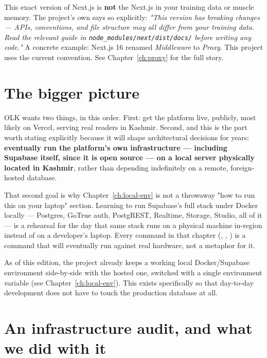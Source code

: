 \begin{olkwarn}
This exact version of Next.js is \textbf{not} the Next.js in your training data or muscle memory. The project's own  says so explicitly: \emph{"This version has breaking changes — APIs, conventions, and file structure may all differ from your training data. Read the relevant guide in \texttt{node\_modules/next/dist/docs/} before writing any code."} A concrete example: Next.js 16 renamed \emph{Middleware} to \emph{Proxy}. This project uses the current  convention. See Chapter~\ref{ch:proxy} for the full story.
\end{olkwarn}

\section{The bigger picture}

OLK wants two things, in this order. First: get the platform live, publicly, most likely on Vercel, serving real readers in Kashmir. Second, and this is the part worth stating explicitly because it will shape architectural decisions for years: \textbf{eventually run the platform's own infrastructure — including Supabase itself, since it is open source — on a local server physically located in Kashmir}, rather than depending indefinitely on a remote, foreign-hosted database.

That second goal is why Chapter~\ref{ch:local-env} is not a throwaway "how to run this on your laptop" section. Learning to run Supabase's full stack under Docker locally — Postgres, GoTrue auth, PostgREST, Realtime, Storage, Studio, all of it — is a rehearsal for the day that same stack runs on a physical machine in-region instead of on a developer's laptop. Every command in that chapter (, , ) is a command that will eventually run against real hardware, not a metaphor for it.

\begin{olknote}
As of this edition, the project already keeps a working local Docker/Supabase environment side-by-side with the hosted one, switched with a single environment variable (see Chapter~\ref{ch:local-env}). This exists specifically so that day-to-day development does not have to touch the production database at all.
\end{olknote}

\section{An infrastructure audit, and what we did with it}
\label{sec:infra-audit}

